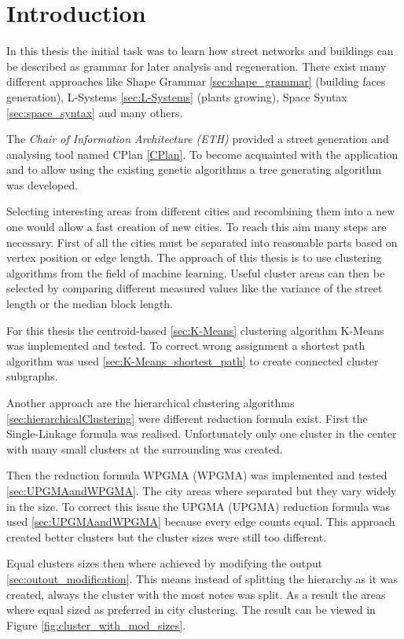 \chapter{Introduction}
In this thesis the initial task was to learn how street networks and buildings can be described as grammar for later analysis and regeneration. There exist many different approaches like Shape Grammar \ref{sec:shape_grammar} (building faces generation), L-Systems \ref{sec:L-Systems} (plants growing), Space Syntax \ref{sec:space_syntax} and many others. 

The \textit{Chair of Information Architecture (ETH)} provided a street generation and analysing tool named CPlan \ref{CPlan}. To become acquainted with the application and to allow using the existing genetic algorithms a tree generating algorithm was developed. 

Selecting interesting areas from different cities and recombining them into a new one would allow a fast creation of new cities. To reach this aim many steps are necessary. First of all the cities must be separated into reasonable parts based on vertex position or edge length. The approach of this thesis is to use clustering algorithms from the field of machine learning. Useful cluster areas can then be selected by comparing different measured values like the variance of the street length or the median block length.

For this thesis the centroid-based \ref{sec:K-Means} clustering algorithm K-Means was implemented and tested. To correct wrong assignment a shortest path algorithm was used \ref{sec:K-Means_shortest_path} to create connected cluster subgraphs.

Another approach are the hierarchical clustering algorithms \ref{sec:hierarchicalClustering} were different reduction formula exist. First the Single-Linkage formula was realised. Unfortunately only one cluster in the center with many small clusters at the surrounding was created.

Then the reduction formula \acrshort{WPGMA} (\acrlong{WPGMA}) was implemented and tested \ref{sec:UPGMAandWPGMA}. The city areas where separated but they vary widely in the size. To correct this issue the \acrshort{UPGMA} (\acrlong{UPGMA}) reduction formula was used \ref{sec:UPGMAandWPGMA} because every edge counts equal. This approach created better clusters but the cluster sizes were still too different.

Equal clusters sizes then where achieved by modifying the output \ref{sec:outout_modification}. This means instead of splitting the hierarchy as it was created, always the cluster with the most notes was split. As a result the areas where equal sized as preferred in city clustering. The result can be viewed in Figure  \ref{fig:cluster_with_mod_sizes}.

